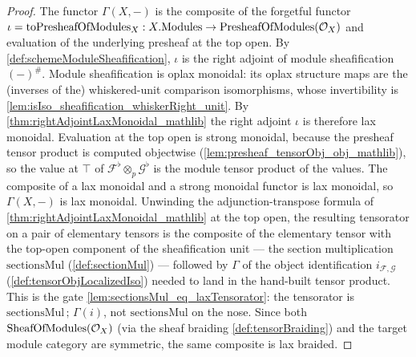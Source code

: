 \begin{proof}
  The functor \(\Gamma(X,-)\) is the composite of the forgetful functor
  \(\iota = \mathrm{toPresheafOfModules}_X : X.\mathrm{Modules} \to \mathrm{PresheafOfModules}(\mathcal{O}_X)\)
  and evaluation of the underlying presheaf at the top open. By
  \cref{def:schemeModuleSheafification}, \(\iota\) is the right adjoint of module
  sheafification \((-)^{\#}\). Module sheafification is oplax monoidal: its
  oplax structure maps are the (inverses of the) whiskered-unit comparison
  isomorphisms, whose invertibility is
  \cref{lem:isIso_sheafification_whiskerRight_unit}. By
  \cref{thm:rightAdjointLaxMonoidal_mathlib} the right adjoint \(\iota\) is
  therefore lax monoidal. Evaluation at the top open is strong monoidal, because
  the presheaf tensor product is computed objectwise
  (\cref{lem:presheaf_tensorObj_obj_mathlib}), so the value at \(\top\) of
  \(\mathcal{F}^{\flat} \otimes_p \mathcal{G}^{\flat}\) is the module tensor
  product of the values. The composite of a lax monoidal and a strong monoidal
  functor is lax monoidal, so \(\Gamma(X,-)\) is lax monoidal. Unwinding the
  adjunction-transpose formula of \cref{thm:rightAdjointLaxMonoidal_mathlib} at the
  top open, the resulting tensorator on a pair of elementary tensors is the
  composite of the elementary tensor with the top-open component of the
  sheafification unit --- the section multiplication \(\mathrm{sectionsMul}\)
  (\cref{def:sectionMul}) --- followed by \(\Gamma\) of the object identification
  \(i_{\mathcal{F},\mathcal{G}}\) (\cref{def:tensorObjLocalizedIso}) needed to land
  in the hand-built tensor product. This is the gate
  \cref{lem:sectionsMul_eq_laxTensorator}: the tensorator is
  \(\mathrm{sectionsMul} \,;\, \Gamma(i)\), not \(\mathrm{sectionsMul}\) on the
  nose. Since both \(\mathrm{SheafOfModules}(\mathcal{O}_X)\) (via the sheaf braiding
  \cref{def:tensorBraiding}) and the target module category are symmetric, the same
  composite is lax braided.
\end{proof}

